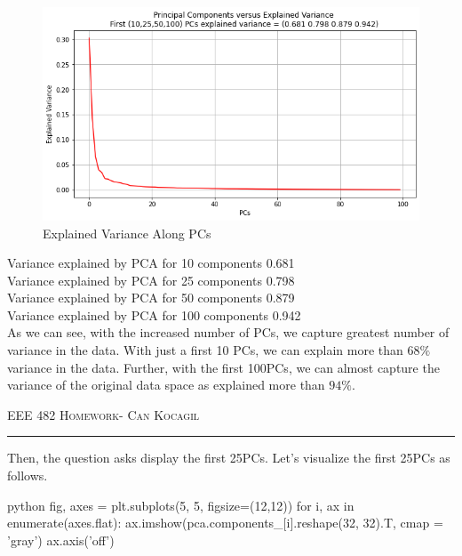 \documentclass[12pt]{amsart}
\begin{document}
\begin{figure}[h]
    \centering
        \includegraphics[width = 1\textwidth]{images/Q1/PCA_variance_explained.png}
        \caption{Explained Variance Along PCs}
\end{figure}

Variance explained by PCA for 10 components  0.681  \\
Variance explained by PCA for 25 components  0.798  \\
Variance explained by PCA for 50 components  0.879  \\
Variance explained by PCA for 100 components 0.942 \\

As we can see, with the increased number of PCs, we capture greatest number of variance in the data. With just a first 10 PCs, we can explain more than $68\%$ variance in the data. Further, with the first 100PCs, we can almost capture the variance of the original data space as explained more than $94\%$.


\newpage
{\scshape EEE 482} \hfill {\scshape \large  Homework-\relax} \hfill {\scshape Can Kocagil}
\smallskip
\hrule
\vspace{2mm}

Then, the question asks display the first 25PCs. Let's visualize the first 25PCs as follows.

\begin{mintedbox}{python}
fig, axes = plt.subplots(5, 5, figsize=(12,12))
for i, ax in enumerate(axes.flat):
    ax.imshow(pca.components_[i].reshape(32, 32).T, cmap = 'gray')
    ax.axis('off')
\end{mintedbox}
\end{document}

